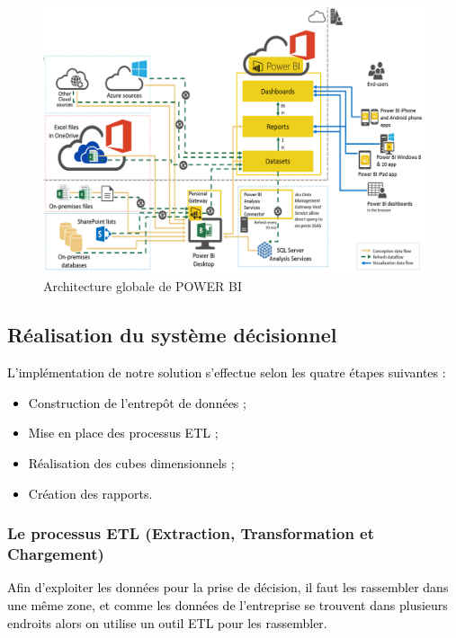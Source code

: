 \documentclass[a4paper,12pt]{report}
\begin{document}
\begin{figure}[H]
	\begin{center}
		\includegraphics[width=1\linewidth]{Projet_O365/archi_BI}
\end{center}
	\caption{Architecture globale de POWER BI}
	\label{fig:12}	
\end{figure}	

\subsection*{Réalisation du système décisionnel}

\textcolor{black}{L’implémentation de notre solution s’effectue selon les quatre étapes suivantes :
\begin{itemize}
	\item   Construction de l’entrepôt de données ;
	\item	Mise en place des processus ETL ;
	\item	Réalisation des cubes dimensionnels ;
	\item	Création des rapports.
\end{itemize}
}
		 	
\subsubsection{Le processus ETL (Extraction, Transformation et Chargement)}

\textcolor{black}{
Afin d’exploiter les données pour la prise de décision, il faut les rassembler dans une même zone, et comme les données de l’entreprise se trouvent dans plusieurs endroits alors on utilise un outil ETL pour les rassembler.}
\end{document}
